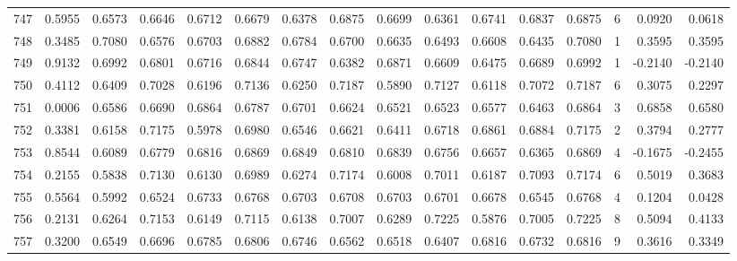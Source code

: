 \begin{tabular}{lrrrrrrrrrrrrrrr}
747 &      0.5955 &  0.6573 &  0.6646 &  0.6712 &  0.6679 &  0.6378 &  0.6875 &  0.6699 &  0.6361 &  0.6741 &   0.6837 &     0.6875 &      6 &                    0.0920 &                     0.0618 \\
748 &      0.3485 &  0.7080 &  0.6576 &  0.6703 &  0.6882 &  0.6784 &  0.6700 &  0.6635 &  0.6493 &  0.6608 &   0.6435 &     0.7080 &      1 &                    0.3595 &                     0.3595 \\
749 &      0.9132 &  0.6992 &  0.6801 &  0.6716 &  0.6844 &  0.6747 &  0.6382 &  0.6871 &  0.6609 &  0.6475 &   0.6689 &     0.6992 &      1 &                   -0.2140 &                    -0.2140 \\
750 &      0.4112 &  0.6409 &  0.7028 &  0.6196 &  0.7136 &  0.6250 &  0.7187 &  0.5890 &  0.7127 &  0.6118 &   0.7072 &     0.7187 &      6 &                    0.3075 &                     0.2297 \\
751 &      0.0006 &  0.6586 &  0.6690 &  0.6864 &  0.6787 &  0.6701 &  0.6624 &  0.6521 &  0.6523 &  0.6577 &   0.6463 &     0.6864 &      3 &                    0.6858 &                     0.6580 \\
752 &      0.3381 &  0.6158 &  0.7175 &  0.5978 &  0.6980 &  0.6546 &  0.6621 &  0.6411 &  0.6718 &  0.6861 &   0.6884 &     0.7175 &      2 &                    0.3794 &                     0.2777 \\
753 &      0.8544 &  0.6089 &  0.6779 &  0.6816 &  0.6869 &  0.6849 &  0.6810 &  0.6839 &  0.6756 &  0.6657 &   0.6365 &     0.6869 &      4 &                   -0.1675 &                    -0.2455 \\
754 &      0.2155 &  0.5838 &  0.7130 &  0.6130 &  0.6989 &  0.6274 &  0.7174 &  0.6008 &  0.7011 &  0.6187 &   0.7093 &     0.7174 &      6 &                    0.5019 &                     0.3683 \\
755 &      0.5564 &  0.5992 &  0.6524 &  0.6733 &  0.6768 &  0.6703 &  0.6708 &  0.6703 &  0.6701 &  0.6678 &   0.6545 &     0.6768 &      4 &                    0.1204 &                     0.0428 \\
756 &      0.2131 &  0.6264 &  0.7153 &  0.6149 &  0.7115 &  0.6138 &  0.7007 &  0.6289 &  0.7225 &  0.5876 &   0.7005 &     0.7225 &      8 &                    0.5094 &                     0.4133 \\
757 &      0.3200 &  0.6549 &  0.6696 &  0.6785 &  0.6806 &  0.6746 &  0.6562 &  0.6518 &  0.6407 &  0.6816 &   0.6732 &     0.6816 &      9 &                    0.3616 &                     0.3349 \\

\end{tabular}
